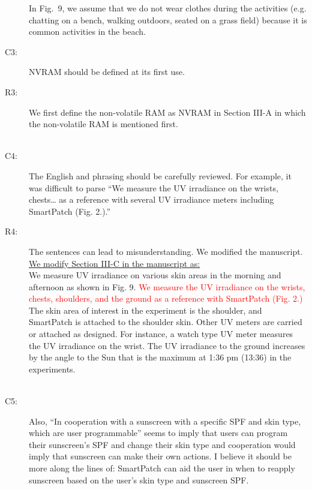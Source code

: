 \documentclass[onecolumn]{IEEEconf}
\begin{document}
\begin{description}
In Fig.~9, we assume that we do not wear clothes during the activities (e.g. chatting on a bench, walking outdoors, seated on a grass field) because it is common activities in the beach. 
~\\

\item [C3: ] NVRAM should be defined at its first use.
\item [R3: ] We first define the non-volatile RAM as NVRAM in Section III-A in which the non-volatile RAM is mentioned first.\\
~\\

\item [C4:] The English and phrasing should be carefully reviewed. For example, it was difficult to parse “We measure the UV irradiance on the wrists, chests… as a reference with several UV irradiance meters including SmartPatch (Fig. 2.).” 

\item [R4: ] The sentences can lead to misunderstanding. We modified the manuscript. \\

\underline{We modify Section III-C in the manuscript as:}\\
We measure UV irradiance on various skin areas in the morning and afternoon as shown in Fig. 9. \textcolor{red}{We measure the UV irradiance on the wrists, chests, shoulders, and the ground as a reference with SmartPatch (Fig. 2.)} The skin area of interest in the experiment is the shoulder, and SmartPatch is attached to the shoulder skin. Other UV meters are carried or attached as designed. For instance, a watch type UV meter measures the UV irradiance on the wrist. The UV irradiance to the ground increases by the angle to the Sun that is the maximum at 1:36 pm (13:36) in the experiments.\\
~\\

\item [C5:] Also, “In cooperation with a sunscreen with a specific SPF and skin type, which are user programmable” seems to imply that users can program their sunscreen’s SPF and change their skin type and cooperation would imply that sunscreen can make their own actions. I believe it should be more along the lines of: SmartPatch can aid the user in when to reapply sunscreen based on the user’s skin type and sunscreen SPF.


\end{description}
\end{document}
